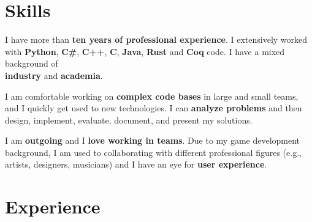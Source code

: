 \documentclass[letterpaper]{twentysecondcv} %
\begin{document}

\makeprofile %


\section{Skills}

I have more than \textbf{ten years of professional experience}. I extensively worked with \textbf{Python}, \textbf{C\#}, \textbf{C++}, \textbf{C}, \textbf{Java}, \textbf{Rust} and \textbf{Coq} code. I have a mixed background of \\\textbf{industry} and \textbf{academia}.

I am comfortable working on \textbf{complex code bases} in large and small teams, and I quickly get used to new technologies. I can \textbf{analyze problems} and then design, implement, evaluate, document, and present my solutions.

I am \textbf{outgoing} and I \textbf{love working in teams}. Due to my game development background, I am used to collaborating with different professional figures (e.g., artists, designers, musicians) and I have an eye for \textbf{user experience}.\\


\section{Experience}
\end{document}
